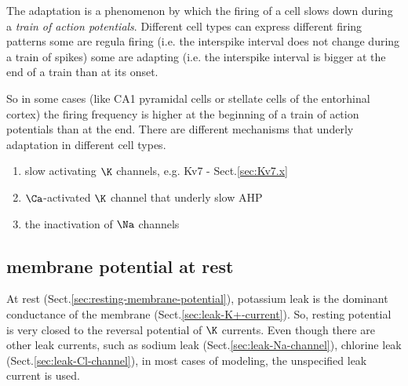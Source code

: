 The adaptation is a phenomenon by which the firing of a cell slows down during a
{\it train of action potentials}.  Different cell types can express different
firing patterns some are regula firing (i.e. the interspike interval does not
change during a train of spikes) some are adapting (i.e. the interspike interval
is bigger at the end of a train than at its onset.

So in some cases (like CA1 pyramidal cells or stellate cells of the entorhinal
cortex) the firing frequency is higher at the beginning of a train of action
potentials than at the end. There are different mechanisms that underly
adaptation in different cell types.

\begin{enumerate}
  \item slow activating $\K$ channels, e.g. Kv7 - Sect.\ref{sec:Kv7.x}
  
  \item $\Ca$-activated $\K$ channel that underly slow AHP
  
  \item the inactivation of $\Na$ channels
\end{enumerate}



\subsection{ membrane potential at rest}

At rest (Sect.\ref{sec:resting-membrane-potential}), potassium leak is the
dominant conductance of the membrane (Sect.\ref{sec:leak-K+-current}). So,
resting potential is very closed to the reversal potential of $\K$ currents.
Even though there are other leak currents, such as sodium leak
(Sect.\ref{sec:leak-Na-channel}), chlorine leak
(Sect.\ref{sec:leak-Cl-channel}), in most cases of modeling, the unspecified
leak current is used.

